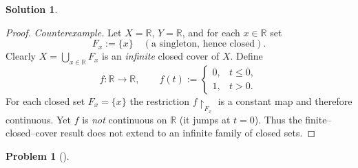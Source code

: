 \documentclass[12pt]{article}
\theoremstyle{definition} %
\newtheorem{solution}{Solution}
\newtheorem{problem}{Problem}
\theoremstyle{plain} %
\begin{document}
\begin{solution}
\begin{proof}
    \emph{Counterexample.}  
    Let $X=\mathbb{R}$, $Y=\mathbb{R}$, and for each $x\in\mathbb{R}$ set
    \[
    F_x:=\{x\}\quad(\text{a singleton, hence closed}).
    \]
    Clearly $\displaystyle X=\bigcup_{x\in\mathbb{R}}F_x$ is an \emph{infinite} closed cover of $X$.
    Define
    \[
    f:\mathbb{R}\longrightarrow\mathbb{R},\qquad
    f(t):=
    \begin{cases}
    0,& t\le 0,\\[2pt]
    1,& t>0.
    \end{cases}
    \]
    For each closed set $F_x=\{x\}$ the restriction $f\!\restriction_{F_x}$ is a constant map
    and therefore continuous.
    Yet $f$ is \emph{not} continuous on $\mathbb{R}$ (it jumps at $t=0$).
    Thus the finite–closed–cover result does not extend to an infinite family of closed sets.
    \end{proof} 
\end{solution}
\begin{problem}[]
  
\end{problem}
\end{document}
